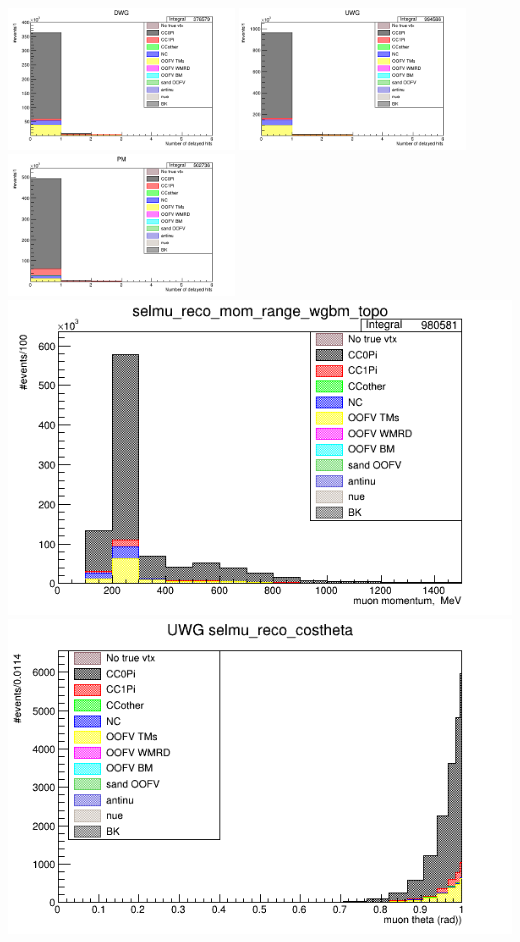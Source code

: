 \documentclass[%
 reprint,
 amsmath,amssymb,
 aps,
]{revtex4-2}
\begin{document}
    \includegraphics[width=0.45\textwidth]{images/num_reco_delayed_hits_wgbm_topo_DWG_accum_level[][26]_data_mc.png}
    \includegraphics[width=0.45\textwidth]{images/num_reco_delayed_hits_wgbm_topo_UWG_accum_level[][16]_data_mc.png}
    \includegraphics[width=0.45\textwidth]{images/num_reco_delayed_hits_wgbm_topo_PM_accum_level[][06]_data_mc.png}
\includegraphics[width=.45\textwidth]{images/selmu_reco_mom_range_UWG_wgbm_topo_accum_level[][16]_data_mc.png}
\includegraphics[width=.45\textwidth]{images/selmu_reco_costheta_wgbm_topo_UWG_accum_level[][16]_data_mc.png}
\end{document}
